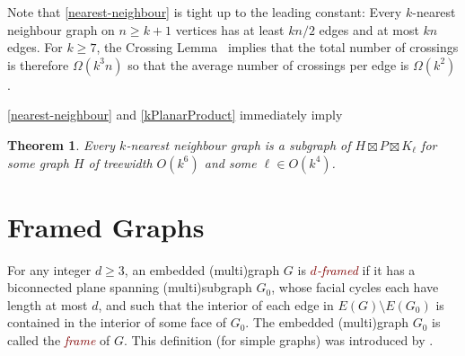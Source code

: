 \documentclass{patmorin}
\theoremstyle{plain}
\newtheorem{thm}{Theorem}
\theoremstyle{definition}
\newcommand{\defin}[1]{\textcolor{Maroon}{\emph{#1}}}
\newcommand{\note}[2]{\noindent{\color{red}[#1:~#2]}}
\renewcommand{\ge}{\geqslant}
\begin{document}
Note that \cref{nearest-neighbour} is tight up to the leading constant:  Every $k$-nearest neighbour graph on $n\ge k+1$ vertices has at least $kn/2$ edges and at most $kn$ edges.  For $k\ge 7$, the Crossing Lemma~\citep{ajtai.chvatal.ea:crossing-free,leighton:complexity} implies that the total number of crossings is therefore $\Omega(k^3n)$ so that the average number of crossings per edge is $\Omega(k^2)$.

\cref{nearest-neighbour} and \cref{kPlanarProduct} immediately imply


\begin{thm}\label{nn_product_structure}
  Every $k$-nearest neighbour graph is a subgraph of $H\boxtimes P\boxtimes K_{\ell}$ for some graph $H$ of treewidth $O(k^6)$ and some $\ell\in O(k^4)$.
\end{thm}

\section{Framed Graphs}
\label{FramedSection}


%

%

For any integer $d\ge 3$, an embedded (multi)graph $G$ is \defin{$d$-framed} if it has a biconnected plane spanning (multi)subgraph $G_0$, whose facial cycles each have length at most $d$,  and such that the interior of each edge in $E(G)\setminus E(G_0)$ is contained in the interior of some face of $G_0$. The embedded (multi)graph $G_0$ is called the \defin{frame} of $G$. This definition (for simple graphs) was introduced by \citet{BDGGMR}.
\end{document}
